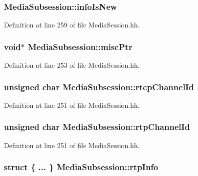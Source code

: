 \subsubsection[{info\+Is\+New}]{ Media\+Subsession\+::info\+Is\+New}\label{classMediaSubsession_a465fae63bae0beac68a67831feb977e6}


Definition at line 259 of file Media\+Session.\+hh.

\subsubsection[{misc\+Ptr}]{\setlength{\rightskip}{0pt plus 5cm}void$\ast$ Media\+Subsession\+::misc\+Ptr}\label{classMediaSubsession_af5d812489822d02212a2189e60b6f966}


Definition at line 253 of file Media\+Session.\+hh.

\subsubsection[{rtcp\+Channel\+Id}]{\setlength{\rightskip}{0pt plus 5cm}unsigned char Media\+Subsession\+::rtcp\+Channel\+Id}\label{classMediaSubsession_ab65868881b7b517f307ac62ed773ab31}


Definition at line 251 of file Media\+Session.\+hh.

\subsubsection[{rtp\+Channel\+Id}]{\setlength{\rightskip}{0pt plus 5cm}unsigned char Media\+Subsession\+::rtp\+Channel\+Id}\label{classMediaSubsession_acc308bd9231307332cf1bd8bd2fc5376}


Definition at line 251 of file Media\+Session.\+hh.

\subsubsection[{rtp\+Info}]{\setlength{\rightskip}{0pt plus 5cm}struct \{ ... \}   Media\+Subsession\+::rtp\+Info}\label{classMediaSubsession_a9ae7b3be9c2eb7361cf8fb4738b2b311}
